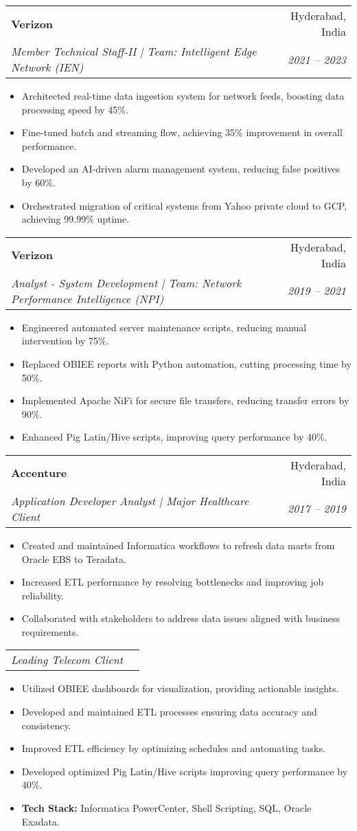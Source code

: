 \documentclass[letterpaper,11pt]{article}
\makeatletter
\newcommand{\resumeSubheading}[4]{
  \vspace{-1pt}\item
    \begin{tabular*}{0.97\textwidth}[t]{l@{\extracolsep{\fill}}r}
      \textbf{#1} & #2 \\
      \textit{\small#3} & \textit{\small#4} \\
    \end{tabular*}\vspace{-5pt}
}
\newcommand{\resumeSubSubheading}[2]{
    \begin{tabular*}{0.97\textwidth}{l@{\extracolsep{\fill}}r}
      \textit{\small#1} & \textit{\small#2} \\
    \end{tabular*}\vspace{-5pt}
}
\newcommand{\resumeItemListStart}{\begin{itemize}}
\newcommand{\resumeItemListEnd}{\end{itemize}\vspace{-5pt}}
\makeatother
\begin{document}
\resumeSubheading
{Verizon}{Hyderabad, India}
{Member Technical Staff-II | Team: Intelligent Edge Network (IEN)}{2021 -- 2023}
\resumeItemListStart
\item Architected real-time data ingestion system for network feeds, boosting data processing speed by 45\%.
\item Fine-tuned batch and streaming flow, achieving 35\% improvement in overall performance.
\item Developed an AI-driven alarm management system, reducing false positives by 60\%.
\item Orchestrated migration of critical systems from Yahoo private cloud to GCP, achieving 99.99\% uptime.
\resumeItemListEnd

\resumeSubheading
{Verizon}{Hyderabad, India}
{Analyst - System Development | Team: Network Performance Intelligence (NPI)}{2019 -- 2021}
\resumeItemListStart
\item Engineered automated server maintenance scripts, reducing manual intervention by 75\%.
\item Replaced OBIEE reports with Python automation, cutting processing time by 50\%.
\item Implemented Apache NiFi for secure file transfers, reducing transfer errors by 90\%.
\item Enhanced Pig Latin/Hive scripts, improving query performance by 40\%.
\resumeItemListEnd

\resumeSubheading
{Accenture}{Hyderabad, India}
{Application Developer Analyst | Major Healthcare Client}{2017 -- 2019}
\resumeItemListStart
\item Created and maintained Informatica workflows to refresh data marts from Oracle EBS to Teradata.
\item Increased ETL performance by resolving bottlenecks and improving job reliability.
\item Collaborated with stakeholders to address data issues aligned with business requirements.
\resumeItemListEnd

\resumeSubSubheading{Leading Telecom Client}{}
\resumeItemListStart
\item Utilized OBIEE dashboards for visualization, providing actionable insights.
\item Developed and maintained ETL processes ensuring data accuracy and consistency.
\item Improved ETL efficiency by optimizing schedules and automating tasks.
\item Developed optimized Pig Latin/Hive scripts improving query performance by 40\%.
\item \textbf{Tech Stack:} Informatica PowerCenter, Shell Scripting, SQL, Oracle Exadata.
\resumeItemListEnd
\end{document}
